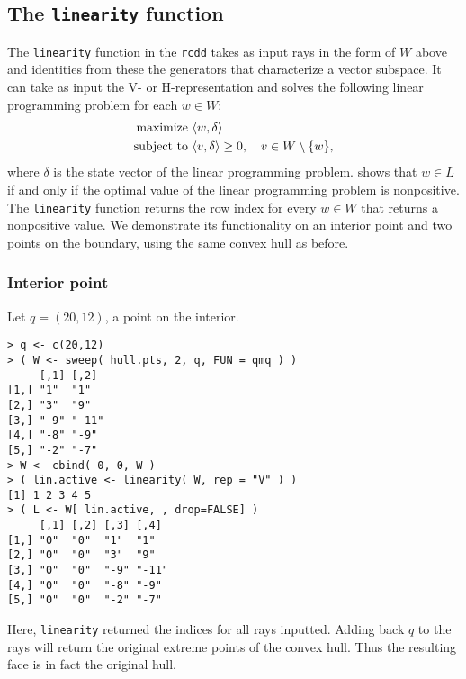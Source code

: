 \subsection{The \texttt{linearity} function}
The \texttt{linearity} function in the \texttt{rcdd} takes as input rays in 
the form of $W$ above and identities from these the generators that characterize
a vector subspace.  It can take as input the V- or H-representation and solves the 
following linear programming problem for each $w \in W$:
\begin{align*}
	\text{maximize } 	&\langle w,\delta \rangle\\
	\text{subject to } 	&\langle v,\delta \rangle \geq 0, \quad v \in W \setminus \{w\},
\end{align*}
where $\delta$ is the state vector of the linear programming problem.  \citet{Geyer:gdor}
shows that $w \in L$ if and only if the optimal value of the linear programming problem is 
nonpositive.  The \texttt{linearity} function returns the row index for every $w \in W$
that returns a nonpositive value.
We demonstrate its functionality on an interior
point and two points on the boundary, using the same convex hull as before.

\subsubsection{Interior point}
Let $q = (20,12)$, a point on the interior.
\begin{verbatim}
> q <- c(20,12)
> ( W <- sweep( hull.pts, 2, q, FUN = qmq ) )
     [,1] [,2] 
[1,] "1"  "1"  
[2,] "3"  "9"  
[3,] "-9" "-11"
[4,] "-8" "-9" 
[5,] "-2" "-7" 
> W <- cbind( 0, 0, W )
> ( lin.active <- linearity( W, rep = "V" ) )
[1] 1 2 3 4 5
> ( L <- W[ lin.active, , drop=FALSE] )
     [,1] [,2] [,3] [,4] 
[1,] "0"  "0"  "1"  "1"  
[2,] "0"  "0"  "3"  "9"  
[3,] "0"  "0"  "-9" "-11"
[4,] "0"  "0"  "-8" "-9" 
[5,] "0"  "0"  "-2" "-7" 
\end{verbatim}
Here, \texttt{linearity} returned the indices for all rays inputted.  Adding
back $q$ to the rays will return the original extreme points of the convex hull.
Thus the resulting face is in fact the original hull.

